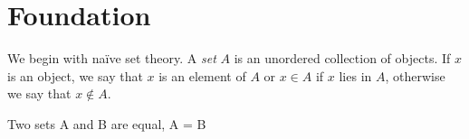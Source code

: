 
\chapter{Foundation}

We begin with na\"ive set theory. A \emph{set} $A$ is an unordered collection of objects. If $x$ is an object, we say that $x$ is an element of $A$ or $x \in A$ if $x$ lies in $A$, otherwise we say that $x \notin A$.

\begin{axiom}[Extension]
    Two sets A and B are equal, A = B
\end{axiom}
